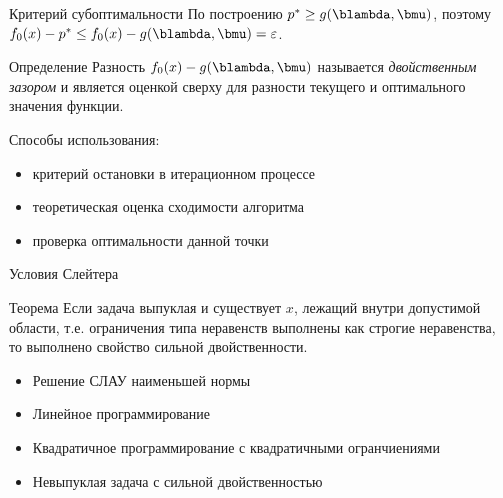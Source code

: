 \documentclass[12pt,russian]{beamer}
\begin{document}
\begin{frame}{Критерий субоптимальности}
По построению $p^* \geq g(\blambda, \bmu)$, поэтому $f_0(x) - p^* \leq f_0(x) - g(\blambda, \bmu) = \varepsilon$.
\begin{block}{Определение}
Разность $f_0(x) - g(\blambda, \bmu)$ называется \emph{двойственным зазором} и является оценкой сверху для разности текущего и оптимального значения функции.
\end{block}
Способы использования:
\begin{itemize}
\item критерий остановки в итерационном процессе
\item теоретическая оценка сходимости алгоритма
\item проверка оптимальности данной точки
\end{itemize}
\end{frame}

\begin{frame}{Условия Слейтера}
\begin{block}{Теорема}
Если задача выпуклая и существует $x$, лежащий внутри допустимой области, т.е. ограничения типа неравенств выполнены как строгие неравенства, то выполнено свойство сильной двойственности.
\end{block}

\begin{itemize}
\item Решение СЛАУ наименьшей нормы
\item Линейное программирование
\item Квадратичное программирование с квадратичными огранчиениями
\item Невыпуклая задача с сильной двойственностью
\end{itemize}
\end{frame}
\end{document}
